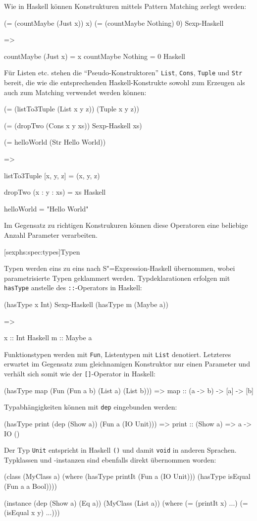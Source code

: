 \documentclass[11pt, a4paper, bibgerm]{scrbook}
\newcommand\icode[1]{\lstinline?#1?}
\newcommand\lsubsection{}
\newcommand{\sexp}{S"=Expression}
\begin{document}
Wie in Haskell können Konstrukturen mittels Pattern Matching zerlegt
werden:
\begin{code}
(= (countMaybe (Just x)) x)
(= (countMaybe Nothing)  0)      Sexp-Haskell

=>

countMaybe (Just x) = x
countMaybe Nothing  = 0          Haskell
\end{code}
Für Listen etc. stehen die ``Pseudo-Konstruktoren'' \icode{List},
\icode{Cons}, \icode{Tuple} und \icode{Str} bereit, die wie die
entsprechenden Haskell-Konstrukte sowohl zum Erzeugen als auch zum
Matching verwendet werden können:
\begin{code}
(= (listTo3Tuple (List x y z)) 
   (Tuple x y z))

(= (dropTwo (Cons x y xs))             Sexp-Haskell
  xs)

(= helloWorld (Str Hello World))

=>

listTo3Tuple [x, y, z] = (x, y, z)

dropTwo (x : y : xs) = xs              Haskell

helloWorld = "Hello World"
\end{code}
Im Gegensatz zu richtigen Konstrukuren können diese Operatoren eine
beliebige Anzahl Parameter verarbeiten.

\lsubsection[sexphs:spec:types]{Typen}

Typen werden eins zu eins nach \sexp{}-Haskell übernommen, wobei
parametrisierte Typen geklammert werden. Typdeklarationen erfolgen
mit \icode{hasType} anstelle des \icode{::}-Operators in Haskell:
\begin{code}
(hasType x Int)
                                      Sexp-Haskell
(hasType m (Maybe a))

=>

x :: Int
                                      Haskell
m :: Maybe a
\end{code}
Funktionstypen werden mit \icode{Fun}, Listentypen mit \icode{List}
denotiert. Letzteres erwartet im Gegensatz zum gleichnamigen
Konstruktor nur einen Parameter und verhält sich somit wie der
\icode{[]}-Operator in Haskell:
\begin{code}
(hasType map (Fun (Fun a b) (List a) (List b)))
=>
map :: (a -> b) -> [a] -> [b]                  
\end{code}
Typabhängigkeiten können mit \icode{dep} eingebunden werden:
\begin{code}
(hasType print (dep (Show a)) (Fun a (IO Unit)))
=>
print :: (Show a) => a -> IO ()
\end{code}
Der Typ \icode{Unit} entspricht in Haskell \icode{()} und damit \icode{void}
in anderen Sprachen. Typklassen und -instanzen sind ebenfalls direkt
übernommen worden:
\begin{code}
(class 
  (MyClass a)
  (where
    (hasType printIt (Fun a (IO Unit)))
    (hasType isEqual (Fun a a Bool))))

(instance (dep (Show a) (Eq a))
  (MyClass (List a))
  (where
    (= (printIt x)   ...)
    (= (isEqual x y) ...)))
\end{code}
\end{document}
